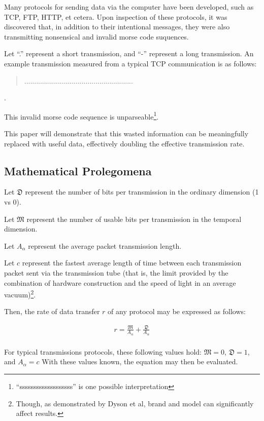 \documentclass[sigplan]{acmart}
\begin{document}
Many protocols for sending data via the computer have been developed,
such as TCP, FTP, HTTP, et cetera. Upon inspection of these protocols,
it was discovered that, in addition to their intentional messages,
they were also transmitting nonsensical and invalid morse code
suquences.

Let ``.'' represent a short transmission, and ``-'' represent a long transmission.
An example transmission measured from a typical TCP communication is as follows:

\begin{quote}
.......................................................
\end{quote}.

This invalid morse code sequence is unparseable\footnote{``sssssssssssssssssss'' is one possible interpretation}.

This paper will demonstrate that this wasted information can be
meaningfully replaced with useful data, effectively doubling
the effective transmission rate.

\subsection{Mathematical Prolegomena}

Let $\mathfrak{D}$ represent the number of bits per transmission
in the ordinary dimension (1 vs 0).

Let $\mathfrak{M}$ represent the number of usable bits per transmission
in the temporal dimension.

Let $A_\alpha$ represent the average packet transmission length.

Let $c$ represent the fastest average length of time between each
transmission packet sent via the transmission tube (that is, the limit provided
by the combination of hardware construction and the speed of light
in an average vacuum)\footnote{ Though, as demonstrated by Dyson et al, brand and model can significantly
affect results.}.

Then, the rate of data transfer $r$ of any protocol may be expressed as follows:

\begin{eqnarray*}
    r = \frac{\mathfrak{M}}{A_\alpha} + \frac{\mathfrak{D}}{A_\alpha} \\
\end{eqnarray*}

For typical transmissions protocols, these following values hold:
$\mathfrak{M} = 0$, $\mathfrak{D} = 1$, and $A_\alpha = c$
With these values known, the equation may then be evaluated.
\end{document}
